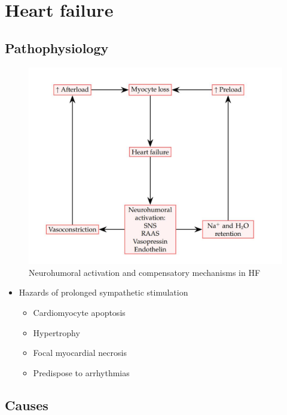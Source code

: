 \documentclass[
  12pt,
]{memoir}
\providecommand{\tightlist}{%
  \setlength{\itemsep}{0pt}\setlength{\parskip}{0pt}}
\begin{document}
\pagebreak

\hypertarget{heart-failure}{%
\section{Heart failure}\label{heart-failure}}

\hypertarget{pathophysiology}{%
\subsection{Pathophysiology}\label{pathophysiology}}

\begin{figure}[h!]
    \centering
    \includegraphics[width=.9\textwidth]{../assets/med/hf-patho.jpg}
    \vspace{3mm}
    \caption{Neurohumoral activation and compensatory mechanisms in HF}
    \label{fig:hf-neuro}
\end{figure}

\begin{itemize}
\tightlist
\item
  Hazards of prolonged sympathetic stimulation

  \begin{itemize}
  \tightlist
  \item
    Cardiomyocyte apoptosis
  \item
    Hypertrophy
  \item
    Focal myocardial necrosis
  \item
    Predispose to arrhythmias
  \end{itemize}
\end{itemize}

\hypertarget{causes-1}{%
\subsection{Causes}\label{causes-1}}
\end{document}
